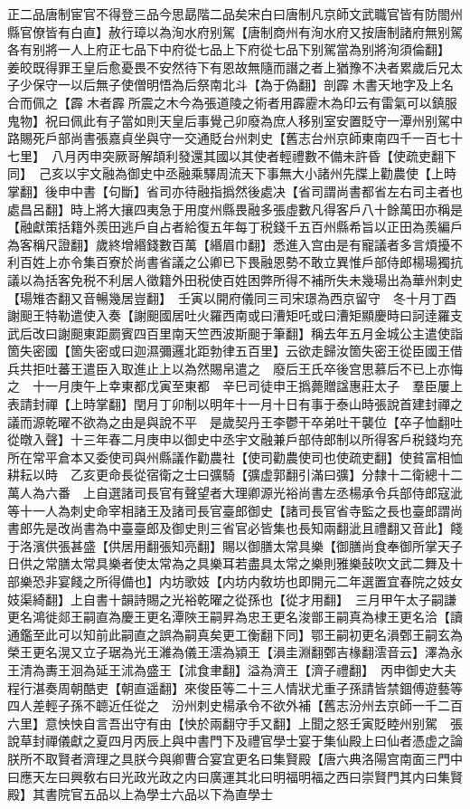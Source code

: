 正二品唐制宦官不得登三品今思勗階二品矣宋白曰唐制凡京師文武職官皆有防閤州縣官僚皆有白直】赦行璋以為洵水府别駕【唐制商州有洵水府又按唐制諸府無别駕各有别將一人上府正七品下中府從七品上下府從七品下别駕當為别將洵須倫翻】　姜皎既得罪王皇后愈憂畏不安然待下有恩故無隨而譖之者上猶豫不决者累歲后兄太子少保守一以后無子使僧明悟為后祭南北斗【為于偽翻】剖霹木書天地字及上名合而佩之【霹木者霹所震之木今為張道陵之術者用霹靂木為印云有雷氣可以鎮服鬼物】祝曰佩此有子當如則天皇后事覺己卯廢為庶人移别室安置貶守一潭州别駕中路賜死戶部尚書張嘉貞坐與守一交通貶台州刺史【舊志台州京師東南四千一百七十七里】　八月丙申突厥哥解頡利發還其國以其使者輕禮數不備未許昏【使疏吏翻下同】　己亥以宇文融為御史中丞融乘驛周流天下事無大小諸州先牒上勸農使【上時掌翻】後申中書【句斷】省司亦待融指撝然後處决【省司謂尚書都省左右司主者也處昌呂翻】時上將大攘四夷急于用度州縣畏融多張虛數凡得客戶八十餘萬田亦稱是【融獻策括籍外羨田逃戶自占者給復五年每丁税錢千五百州縣希旨以正田為羨編戶為客稱尺證翻】歲終增緡錢數百萬【緡眉巾翻】悉進入宫由是有寵議者多言煩擾不利百姓上亦令集百寮於尚書省議之公卿已下畏融恩勢不敢立異惟戶部侍郎楊瑒獨抗議以為括客免税不利居人徵籍外田税使百姓困弊所得不補所失未幾瑒出為華州刺史【瑒雉杏翻又音暢幾居豈翻】　壬寅以開府儀同三司宋璟為西京留守　冬十月丁酉謝䫻王特勒遣使入奏【謝䫻國居吐火羅西南或曰漕矩吒或曰漕矩顯慶時曰訶逹羅支武后改曰謝䫻東距罽賓四百里南天竺西波斯䫻于筆翻】稱去年五月金城公主遣使詣箇失密國【箇失密或曰迦濕彌邏北距勃律五百里】云欲走歸汝箇失密王從臣國王借兵共拒吐蕃王遣臣入取進止上以為然賜帛遣之　廢后王氏卒後宫思慕后不已上亦悔之　十一月庚午上幸東都戊寅至東都　辛巳司徒申王撝薨贈諡惠莊太子　羣臣屢上表請封禪【上時掌翻】閏月丁卯制以明年十一月十日有事于泰山時張說首建封禪之議而源乾曜不欲為之由是與說不平　是歲契丹王李鬱干卒弟吐干襲位【卒子恤翻吐從暾入聲】十三年春二月庚申以御史中丞宇文融兼戶部侍郎制以所得客戶税錢均充所在常平倉本又委使司與州縣議作勸農社【使司勸農使司也使疏吏翻】使貧富相恤耕耘以時　乙亥更命長從宿衛之士曰彍騎【彍虚郭翻引滿曰彍】分隸十二衛總十二萬人為六番　上自選諸司長官有聲望者大理卿源光裕尚書左丞楊承令兵部侍郎寇泚等十一人為刺史命宰相諸王及諸司長官臺郎御史【諸司長官省寺監之長也臺郎謂尚書郎先是改尚書為中臺臺郎及御史則三省官必皆集也長知兩翻泚且禮翻又音此】餞于洛濱供張甚盛【供居用翻張知亮翻】賜以御膳太常具樂【御膳尚食奉御所掌天子日供之常膳太常具樂者使太常為之具樂耳若盡具太常之樂則雅樂鼔吹文武二舞及十部樂恐非宴餞之所得備也】内坊歌妓【内坊内敎坊也即開元二年選置宜春院之妓女妓渠綺翻】上自書十韻詩賜之光裕乾曜之從孫也【從才用翻】　三月甲午太子嗣謙更名鴻徙郯王嗣直為慶王更名潭陜王嗣昇為忠王更名浚鄫王嗣真為棣王更名洽【讀通鑑至此可以知前此嗣直之誤為嗣真矣更工衡翻下同】鄂王嗣初更名溳鄄王嗣玄為榮王更名滉又立子琚為光王濰為儀王澐為潁王【溳圭淵翻鄄吉椽翻澐音云】澤為永王清為夀王洄為延王沭為盛王【沭食聿翻】溢為濟王【濟子禮翻】　丙申御史大夫程行湛奏周朝酷吏【朝直遥翻】來俊臣等二十三人情狀尤重子孫請皆禁錮傅遊藝等四人差輕子孫不聼近任從之　汾州刺史楊承令不欲外補【舊志汾州去京師一千二百六里】意怏怏自言吾出守有由【怏於兩翻守手又翻】上聞之怒壬寅貶睦州别駕　張說草封禪儀獻之夏四月丙辰上與中書門下及禮官學士宴于集仙殿上曰仙者憑虚之論朕所不取賢者濟理之具朕今與卿曹合宴宜更名曰集賢殿【唐六典洛陽宫南面三門中曰應天左曰興敎右曰光政光政之内曰廣運其北曰明福明福之西曰崇賢門其内曰集賢殿】其書院官五品以上為學士六品以下為直學士